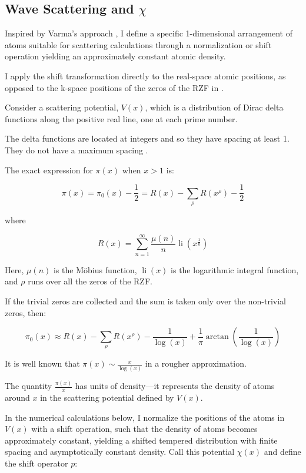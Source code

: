 \documentclass[11pt, oneside]{article}
\begin{document}
\subsection{Wave Scattering and $\chi$}
Inspired by Varma's approach \cite{Varma2016}, I define a specific 1-dimensional arrangement of atoms suitable for scattering calculations through a normalization or shift operation yielding an approximately constant atomic density.

I apply the shift transformation directly to the real-space atomic positions, as opposed to the k-space positions of the zeros of the RZF in \cite{Varma2016}.

Consider a scattering potential, $V(x)$, which is a distribution of Dirac delta functions along the positive real line, one at each prime number.

The delta functions are located at integers and so they have spacing at least 1. They do not have a maximum spacing \cite{Westzynthius1931, Erdos1950}.

The exact expression \cite{Riemann1859} for $\pi(x)$ when $x>1$ is:

\begin{equation}
\pi(x) = \pi_0(x) - \frac{1}{2} = R(x) - \sum_{\rho}R(x^{\rho}) - \frac{1}{2}
\end{equation}

where

\begin{equation}
R(x) = \sum_{n=1}^{\infty}\frac{\mu(n)}{n}\operatorname{li}(x^{\frac{1}{n}})
\end{equation}

Here, $\mu(n)$ is the Möbius function, $\operatorname{li}(x)$ is the logarithmic integral function, and $\rho$ runs over all the zeros of the RZF.

If the trivial zeros are collected and the sum is taken only over the non-trivial zeros, then:

\begin{equation}
\pi_0(x) \approx R(x) - \sum_{\rho}R(x^{\rho}) - \frac{1}{\log(x)} + \frac{1}{\pi}\arctan\left(\frac{1}{\log(x)}\right)
\end{equation}
 
It is well known that $\pi(x) \sim \frac{x}{\log(x)}$ in a rougher approximation.

The quantity $\frac{\pi(x)}{x}$ has units of density—it represents the density of atoms around $x$ in the scattering potential defined by $V(x)$.

In the numerical calculations below, I normalize the positions of the atoms in $V(x)$ with a shift operation, such that the density of atoms becomes approximately constant, yielding a shifted tempered distribution with finite spacing and asymptotically constant density. Call this potential $\chi(x)$ and define the shift operator $p$:
\end{document}
